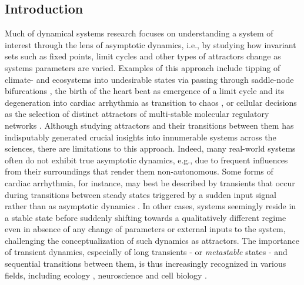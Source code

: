 \documentclass{article}
\theoremstyle{definition}
\begin{document}
\begin{refsection}
\section{Introduction}

Much of dynamical systems research focuses on understanding a system of interest through the lens of asymptotic dynamics, i.e., by studying how invariant sets such as fixed points, limit cycles and other types of attractors change as systems parameters are varied. Examples of this approach include tipping of climate- and ecosystems into undesirable states via passing through saddle-node bifurcations \cite{Scheffer1993-hn,Ibelings2007,Schmitt2019,Wunderling2021,Lohmann2024-pk}, the birth of the heart beat as emergence of a limit cycle \cite{Jia2023-wo} and its degeneration into cardiac arrhythmia as transition to chaos \cite{Garfinkel1992,Weiss1999,Sato2010}, or cellular decisions as the selection of distinct attractors of multi-stable molecular regulatory networks \cite{Xiong2003-ah,Ozbudak2004-vv,Byrne2016-kw}. Although studying attractors and their transitions between them has 
indisputably generated crucial insights into innumerable systems across the sciences, there are limitations to this approach. Indeed, many real-world systems often do not exhibit true asymptotic dynamics, e.g., due to frequent influences from their surroundings that render them non-autonomous. Some forms of cardiac arrhythmia, for instance, may best be described by transients that occur during transitions between steady states triggered by a sudden input signal rather than as asymptotic dynamics \cite{Xie2014}. In other cases, systems seemingly reside in a stable state before suddenly shifting towards a qualitatively different regime even in absence of any change of parameters or external inputs to the system, challenging the conceptualization of such dynamics as attractors. The importance of transient dynamics, especially of long transients - or \textit{metastable} states - and sequential transitions between them, is thus increasingly recognized in various fields, including ecology \cite{Hastings_2018,Morozov2024}, neuroscience \cite{Rossi_2025,Hancock2024} and cell biology \cite{Farjami_2021,Kelsh2021,Koch_2024}. 


\end{refsection}
\end{document}
